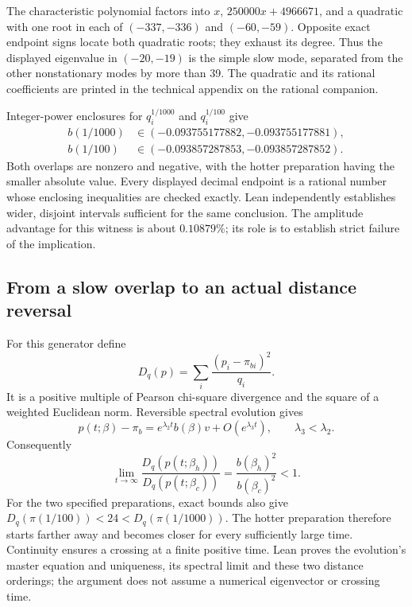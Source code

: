 \documentclass[11pt]{article}
\begin{document}
The characteristic polynomial factors into $x$, $250000x+4966671$, and
a quadratic with one root in each of $(-337,-336)$ and $(-60,-59)$.
Opposite exact endpoint signs locate both quadratic roots; they exhaust
its degree. Thus the displayed eigenvalue in $(-20,-19)$ is the simple
slow mode, separated from the other nonstationary modes by more than 39.
The quadratic and its rational coefficients are printed in the technical
appendix on the rational companion.

Integer-power enclosures for $q_i^{1/1000}$ and $q_i^{1/100}$ give
\begin{align}
 b(1/1000)&\in(-0.093755177882,-0.093755177881),\label{eq:intervals}\\
 b(1/100)&\in(-0.093857287853,-0.093857287852).\nonumber
\end{align}
Both overlaps are nonzero and negative, with the hotter preparation
having the smaller absolute value. Every displayed decimal endpoint is
a rational number whose enclosing inequalities are checked exactly.
Lean independently establishes wider, disjoint intervals sufficient for
the same conclusion. The amplitude advantage for this witness is about
$0.10879\%$; its role is to establish strict failure of the implication.

\subsection{From a slow overlap to an actual distance reversal}
For this generator define
\begin{equation}\label{eq:distance}
 D_q(p)=\sum_i\frac{(p_i-\pi_{bi})^2}{q_i}.
\end{equation}
It is a positive multiple of Pearson chi-square divergence and the square
of a weighted Euclidean norm. Reversible spectral evolution gives
\begin{equation}\label{eq:spectral}
 p(t;\beta)-\pi_b=e^{\lambda_2t}b(\beta)v+O(e^{\lambda_3t}),
 \qquad \lambda_3<\lambda_2.
\end{equation}
Consequently
\[
 \lim_{t\to\infty}\frac{D_q(p(t;\beta_h))}{D_q(p(t;\beta_c))}
 =\frac{b(\beta_h)^2}{b(\beta_c)^2}<1.
\]
For the two specified preparations, exact bounds also give
$D_q(\pi(1/100))<24<D_q(\pi(1/1000))$.
The hotter preparation therefore starts farther away and becomes closer
for every sufficiently large time. Continuity ensures a crossing at a
finite positive time. Lean proves the evolution's master equation and
uniqueness, its spectral limit and these two distance orderings; the
argument does not assume a numerical eigenvector or crossing time.
\end{document}

